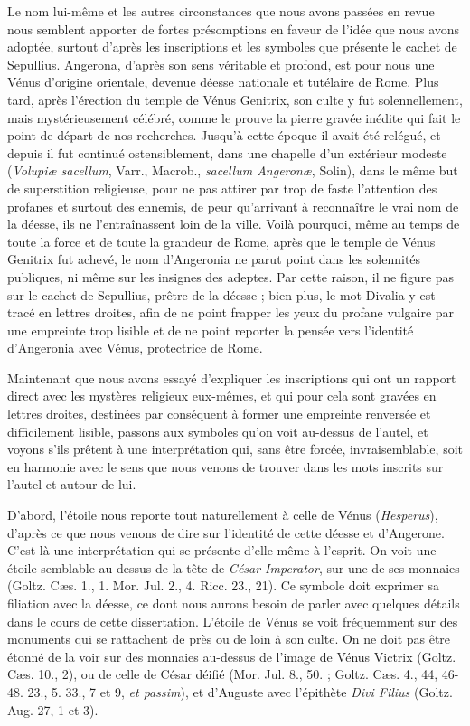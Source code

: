 \documentclass[a4paper, 11pt, oneside, polutonikogreek, french]{article}
\begin{document}
Le nom lui-même et les autres circonstances que nous avons passées en revue nous semblent apporter de fortes présomptions en faveur de l'idée que nous avons adoptée, surtout d'après les inscriptions et les symboles que présente le cachet de Sepullius. Angerona, d'après son sens véritable et profond, est pour nous une Vénus d'origine orientale, devenue déesse nationale et tutélaire de Rome. Plus tard, après l'érection du temple de Vénus Genitrix, son culte y fut solennellement, mais mystérieusement célébré, comme le prouve la pierre gravée inédite qui fait le point de départ de nos recherches. Jusqu'à cette époque il avait été relégué, et depuis il fut continué ostensiblement, dans une chapelle d'un extérieur modeste (\emph{Volupiæ sacellum}, Varr., Macrob., \emph{sacellum Angeronæ}, Solin), dans le même but de superstition religieuse, pour ne pas attirer par trop de faste l'attention des profanes et surtout des ennemis, de peur qu'arrivant à reconnaître le vrai nom de la déesse, ils ne l'entraînassent loin de la ville. Voilà pourquoi, même au temps de toute la force et de toute la grandeur de Rome, après que le temple de Vénus Genitrix fut achevé, le nom d'Angeronia ne parut point dans les solennités publiques, ni même sur les insignes des adeptes. Par cette raison, il ne figure pas sur le cachet de Sepullius, prêtre de la déesse ; bien plus, le mot Divalia y est tracé en lettres droites, afin de ne point frapper les yeux du profane vulgaire par une empreinte trop lisible et de ne point reporter la pensée vers l'identité d'Angeronia avec Vénus, protectrice de Rome.

Maintenant que nous avons essayé d'expliquer les inscriptions qui ont un rapport direct avec les mystères religieux eux-mêmes, et qui pour cela sont gravées en lettres droites, destinées par conséquent à former une empreinte renversée et difficilement lisible, passons aux symboles qu'on voit au-dessus de l'autel, et voyons s'ils prêtent à une interprétation qui, sans être forcée, invraisemblable, soit en harmonie avec le sens que nous venons de trouver dans les mots inscrits sur l'autel et autour de lui.

D'abord, l'étoile nous reporte tout naturellement à celle de Vénus (\emph{Hesperus}), d'après ce que nous venons de dire sur l'identité de cette déesse et d'Angerone. C'est là une interprétation qui se présente d'elle-même à l'esprit. On voit une étoile semblable au-dessus de la tête de \emph{César Imperator}, sur une de ses monnaies (Goltz. Cæs. 1., 1. Mor. Jul. 2., 4. Ricc. 23., 21). Ce symbole doit exprimer sa filiation avec la déesse, ce dont nous aurons besoin de parler avec quelques détails dans le cours de cette dissertation. L'étoile de Vénus se voit fréquemment sur des monuments qui se rattachent de près ou de loin à son culte. On ne doit pas être étonné de la voir sur des monnaies au-dessus de l'image de Vénus Victrix (Goltz. Cæs. 10., 2), ou de celle de César déifié (Mor. Jul. 8., 50. ; Goltz. Cæs. 4., 44, 46-48. 23., 5. 33., 7 et 9, \emph{et passim}), et d'Auguste avec l'épithète \emph{Divi Filius} (Goltz. Aug. 27, 1 et 3).
\end{document}
